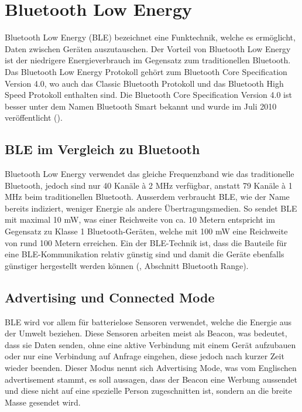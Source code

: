 \section{Bluetooth Low Energy}\label{t_ble} 

Bluetooth Low Energy (BLE) bezeichnet eine Funktechnik, welche es ermöglicht, Daten zwischen Geräten auszutauschen. Der Vorteil von Bluetooth Low Energy ist der niedrigere Energieverbrauch im Gegensatz zum traditionellen Bluetooth. Das Bluetooth Low Energy Protokoll gehört zum Bluetooth Core Specification Version 4.0, wo auch das Classic Bluetooth Protokoll und das Bluetooth High Speed Protokoll enthalten sind. Die Bluetooth Core Specification Version 4.0 ist besser unter dem Namen Bluetooth Smart bekannt und wurde im Juli 2010 veröffentlicht (\cite{youtube_BLE}).

\subsection{BLE im Vergleich zu Bluetooth}
  
Bluetooth Low Energy verwendet das gleiche Frequenzband wie das traditionelle Bluetooth, jedoch sind nur 40 Kanäle à 2 MHz verfügbar, anstatt 79 Kanäle à 1 MHz beim traditionellen Bluetooth. Ausserdem verbraucht BLE, wie der Name bereits indiziert, weniger Energie als andere Übertragungsmedien. So sendet BLE mit maximal 10 mW, was einer Reichweite von ca. 10 Metern entspricht im Gegensatz zu Klasse 1 Bluetooth-Geräten, welche mit 100 mW eine Reichweite von rund 100 Metern erreichen. Ein  der BLE-Technik ist, dass die Bauteile für eine BLE-Kommunikation relativ günstig sind und damit die Geräte ebenfalls günstiger hergestellt werden können (\cite{Interent_BLE}, Abschnitt Bluetooth Range).

\subsection{Advertising und Connected Mode}

BLE wird vor allem für batterielose Sensoren verwendet, welche die Energie aus der Umwelt beziehen. Diese Sensoren arbeiten meist als Beacon, was bedeutet, dass sie Daten senden, ohne eine aktive Verbindung mit einem Gerät aufzubauen oder nur eine Verbindung auf Anfrage eingehen, diese jedoch nach kurzer Zeit wieder beenden. Dieser Modus nennt sich Advertising Mode, was vom Englischen advertisement stammt, es soll aussagen, dass der Beacon eine Werbung aussendet und diese nicht auf eine spezielle Person zugeschnitten ist, sondern an die breite Masse gesendet wird.

